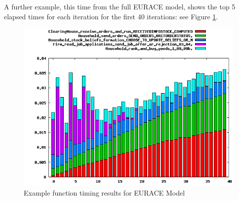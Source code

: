 A further example, this time from the full EURACE model, shows the top 5 elapsed times for each iteration for the first 40 iterations: see Figure \ref{fig:timing_example}.

\begin{figure}[h]
  \hspace{-10mm}
  \includegraphics[scale=0.5]{timing_example.png}
 \caption{Example function timing results for EURACE Model}
 \label{fig:timing_example}
\end{figure}

